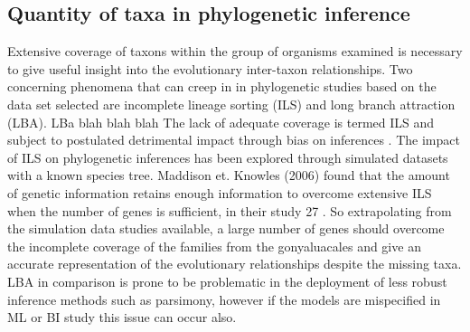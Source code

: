 \documentclass[12pt]{article}
\begin{document}
\subsection*{Quantity of taxa in phylogenetic inference}
Extensive coverage of taxons within the group of organisms examined is necessary to give useful insight into the evolutionary inter-taxon relationships. 
Two concerning phenomena that can creep in in phylogenetic studies based on the data set selected are incomplete lineage sorting (ILS) and long branch attraction (LBA). 
LBa blah blah blah 
The lack of adequate coverage is termed ILS and subject to postulated detrimental impact through bias on inferences \cite{heath2008taxon}. 
The impact of ILS on phylogenetic inferences has been explored through simulated datasets with a known species tree. 
Maddison et. Knowles (2006) found that the amount of genetic information retains enough information to overcome extensive ILS when the number of genes is sufficient, in their study 27 \cite{maddison2006inferring}. 
So extrapolating from the simulation data studies available, a large number of genes should overcome the incomplete coverage of the families from the gonyaluacales and give an accurate representation of the evolutionary relationships despite the missing taxa. 
LBA in comparison is prone to be problematic in the deployment of less robust inference methods such as parsimony, however if the models are mispecified in ML or BI study this issue can occur also. 
\end{document}
